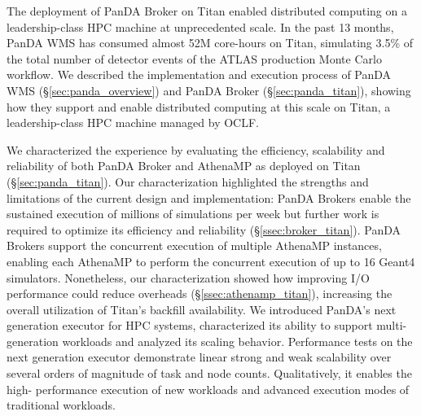 
The deployment of PanDA Broker on Titan enabled distributed computing on a
leadership-class HPC machine at unprecedented scale. In the past 13 months,
PanDA WMS has consumed almost 52M core-hours on Titan, simulating 3.5\% of
the total number of detector events of the ATLAS production Monte Carlo
workflow. We described the implementation and execution process of PanDA WMS
(\S\ref{sec:panda_overview}) and PanDA Broker (\S\ref{sec:panda_titan}),
showing how they support and enable distributed computing at this scale on
Titan, a leadership-class HPC machine managed by OCLF.

We characterized the experience by evaluating the efficiency, scalability and
reliability of both PanDA Broker and AthenaMP as deployed on Titan
(\S\ref{sec:panda_titan}). Our characterization highlighted the strengths and
limitations of the current design and implementation: PanDA Brokers enable
the sustained execution of millions of simulations per week but further work
is required to optimize its efficiency and reliability
(\S\ref{ssec:broker_titan}). PanDA Brokers support the concurrent execution
of multiple AthenaMP instances, enabling each AthenaMP to perform the
concurrent execution of up to 16 Geant4 simulators. Nonetheless, our
characterization showed how improving I/O performance could reduce overheads
(\S\ref{ssec:athenamp_titan}), increasing the overall utilization of Titan's
backfill availability. We introduced PanDA's next generation executor for HPC
systems, characterized its ability to support multi-generation workloads and
analyzed its scaling behavior.  Performance tests on the next generation
executor demonstrate linear strong and weak scalability over several orders
of magnitude  of task and node counts.  Qualitatively, it enables the high-
performance execution of new workloads and advanced execution modes of
traditional workloads.

